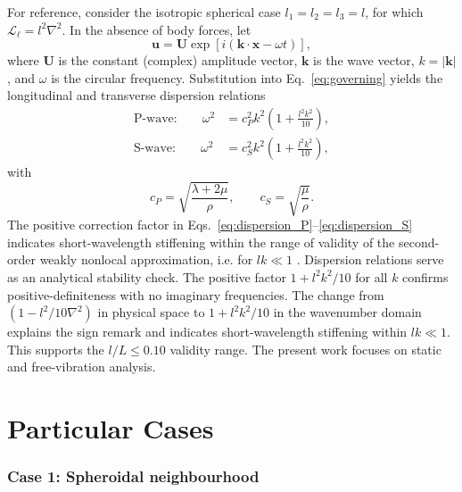 \documentclass[final,3p,times,fleqn]{elsarticle}
\begin{document}
For reference, consider the isotropic spherical case
$l_1=l_2=l_3=l$, for which
$\mathcal{L}_{\ell}=l^2\nabla^2$. In the absence of body forces, let
\begin{equation}\label{eq:plane_wave}
\mathbf{u}
=
\mathbf{U}\exp\left[i(\mathbf{k}\cdot\mathbf{x}-\omega t)\right],
\end{equation}
where $\mathbf{U}$ is the constant (complex) amplitude vector, $\mathbf{k}$ is the wave vector, $k=|\mathbf{k}|$, and $\omega$ is
the circular frequency. Substitution into Eq.~\eqref{eq:governing}
yields the longitudinal and transverse dispersion relations
\begin{align}
\text{P-wave:}\qquad
\omega^2
&=
c_P^2 k^2
\left(
1+\frac{l^2 k^2}{10}
\right),
\label{eq:dispersion_P}
\\
\text{S-wave:}\qquad
\omega^2
&=
c_S^2 k^2
\left(
1+\frac{l^2 k^2}{10}
\right),
\label{eq:dispersion_S}
\end{align}
with
\begin{equation}\label{eq:wave_speeds}
c_P
=
\sqrt{\frac{\lambda+2\mu}{\rho}},
\qquad
c_S
=
\sqrt{\frac{\mu}{\rho}}.
\end{equation}
The positive correction factor in
Eqs.~\eqref{eq:dispersion_P}--\eqref{eq:dispersion_S} indicates
short-wavelength stiffening within the range of validity of the
second-order weakly nonlocal approximation, i.e. for $lk\ll1$
\cite{MetrikineAskes2002,AskesAifantis2011}.
Dispersion relations serve as an analytical stability check. The positive factor $1+l^2k^2/10$ for all $k$ confirms positive-definiteness with no imaginary frequencies. The change from $(1-l^2/10\nabla^2)$ in physical space to $1+l^2k^2/10$ in the wavenumber domain explains the sign remark and indicates short-wavelength stiffening within $lk\ll1$. This supports the $l/L\le0.10$ validity range. The present work focuses on static and free-vibration analysis.

\section{Particular Cases}

\subsubsection*{Case 1: Spheroidal neighbourhood}
\end{document}
